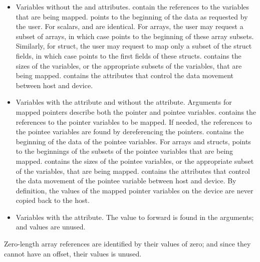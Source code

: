 %
\begin{itemize}
  \item Variables without the  and  attributes.   contain the references to the variables that are being mapped.   points to the beginning of the data as requested by the user. For scalars,   and  are identical. For arrays, the user may request a subset of arrays, in which case  points to the beginning of these array subsets. Similarly, for struct, the user may request to map only a subset of the struct fields, in which case   points to the first fields of these structs.  contains the sizes of the variables, or the appropriate subsets of the variables, that are being mapped.  contains the attributes that control the data movement between host and device.

  \item Variables with the  attribute and without the  attribute. Arguments for mapped pointers describe both the pointer and pointee variables.   contains the references to the pointer variables to be mapped.  If needed, the references to the pointee variables are found by dereferencing the  pointers.  contains the beginning of the data of the pointee variables.   For arrays and structs,  points to the beginnings of the subsets of the pointee variables that are being mapped.  contains the sizes of the pointee variables, or the appropriate subset of the variables, that are being mapped.   contains the attributes that control the data movement of the pointee variable between host and device. By definition, the values of the mapped pointer variables on the device are never copied back to the host.
  
  \item Variables with the  attribute. The value to forward is found in the  arguments;   and  values are unused.
%
\end{itemize}

\fussy

Zero-length array references are identified by their  values of zero; and since they cannot have an offset, their  values is unused.

